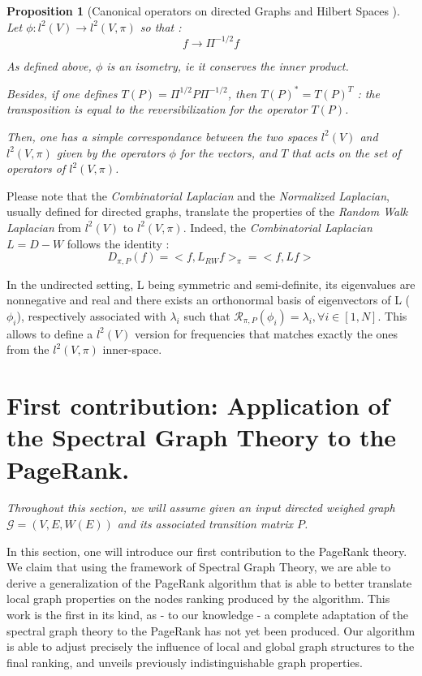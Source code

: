 \documentclass{article}
\newtheorem{prop}{Proposition}[section]
\begin{document}
\begin{prop}[Canonical operators on directed Graphs and Hilbert Spaces \cite{sevi2019}]

Let $\phi: l^2(V) \rightarrow  l^2(V, \pi) $ so that :
\begin{equation}
    f \rightarrow \Pi^{-1/2}f
\end{equation}  

As defined above, $\phi$ is an isometry, ie it conserves the inner product.

Besides, if one defines $T(P) = \Pi^{1/2} P \Pi^{-1/2}$, then $ T(P)^* = T(P)^T$ : the transposition is equal to the reversibilization for the operator $T(P)$.

Then, one has a simple correspondance between the two spaces $l^2(V)$ and $l^2(V, \pi)$ given by the operators $\phi$ for the vectors, and $T$ that acts on the set of operators of $l^2(V, \pi)$.

\end{prop}

Please note that the \textit{Combinatorial Laplacian} and the \textit{Normalized Laplacian}, usually defined for directed graphs, translate the properties of the \textit{Random Walk Laplacian} from $l^2(V)$ to $l^2(V, \pi)$. Indeed, the \textit{Combinatorial Laplacian} $L = D-W$ follows the identity :
\begin{equation}
    D_{\pi, P}(f) = <f, L_{RW} f>_\pi = <f,Lf>
\end{equation}

In the undirected setting, L being symmetric and semi-definite, its eigenvalues are nonnegative and real and there exists an orthonormal basis of eigenvectors of L ($\phi_i$), respectively associated with $\lambda_i$ such that $\mathcal{R}_{\pi,P}(\phi_i) = \lambda_i, \forall i \in [1,N]$. This allows to define a $l^2(V)$ version for frequencies that matches exactly the ones from the $l^2(V, \pi)$ inner-space.


\section{First contribution: Application of the Spectral Graph Theory to the PageRank.}\label{sec:SGTapplicationToPR}

\textit{Throughout this section, we will assume given an input directed weighed graph $\mathcal{G}=(V,E,W(E))$ and its associated transition matrix $P$.}

In this section, one will introduce our first contribution to the PageRank theory. We claim that using the framework of Spectral Graph Theory, we are able to derive a generalization of the PageRank algorithm that is able to better translate local graph properties on the nodes ranking produced by the algorithm. This work is the first in its kind, as - to our knowledge - a complete adaptation of the spectral graph theory to the PageRank has not yet been produced. Our algorithm is able to adjust precisely the influence of local and global graph structures to the final ranking, and unveils previously indistinguishable graph properties.
\end{document}
